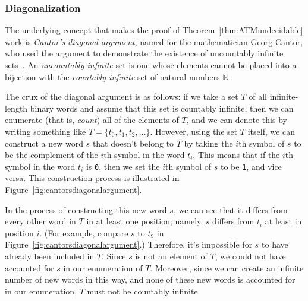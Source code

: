 \subsubsection*{Diagonalization}

The underlying concept that makes the proof of Theorem~\ref{thm:ATMundecidable} work is \emph{Cantor's diagonal argument}, named for the mathematician Georg Cantor, who used the argument to demonstrate the existence of uncountably infinite sets~\citeyearpar{Cantor1891Mannigfaltigkeitslehre}. An \emph{uncountably infinite} set is one whose elements cannot be placed into a bijection with the \emph{countably infinite} set of natural numbers $\mathbb{N}$.

The crux of the diagonal argument is as follows: if we take a set $T$ of all infinite-length binary words and assume that this set is countably infinite, then we can enumerate (that is, \emph{count}) all of the elements of $T$, and we can denote this by writing something like $T = \{t_{0}, t_{1}, t_{2}, \dots\}$. However, using the set $T$ itself, we can construct a new word $s$ that doesn't belong to $T$ by taking the $i$th symbol of $s$ to be the complement of the $i$th symbol in the word $t_{i}$. This means that if the $i$th symbol in the word $t_{i}$ is \texttt{0}, then we set the $i$th symbol of $s$ to be \texttt{1}, and vice versa. This construction process is illustrated in Figure~\ref{fig:cantorsdiagonalargument}.

In the process of constructing this new word $s$, we can see that it differs from every other word in $T$ in at least one position; namely, $s$ differs from $t_{i}$ at least in position $i$. (For example, compare $s$ to $t_{9}$ in Figure~\ref{fig:cantorsdiagonalargument}.) Therefore, it's impossible for $s$ to have already been included in $T$. Since $s$ is not an element of $T$, we could not have accounted for $s$ in our enumeration of $T$. Moreover, since we can create an infinite number of new words in this way, and none of these new words is accounted for in our enumeration, $T$ must not be countably infinite.


